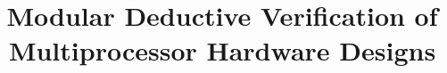 
\title{Modular Deductive Verification of Multiprocessor Hardware Designs}






\authorinfo{}{}

\maketitle %


\begin{abstract}

\end{abstract}





